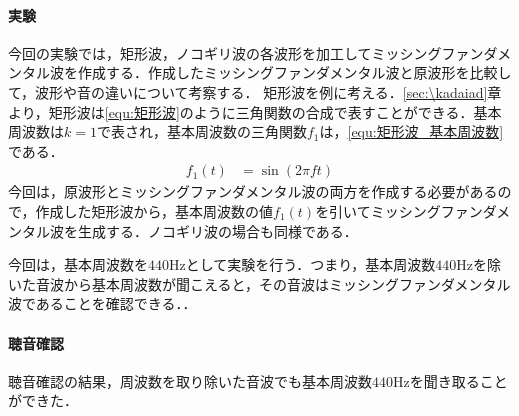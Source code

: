 \paragraph{実験}
今回の実験では，矩形波，ノコギリ波の各波形を加工してミッシングファンダメンタル波を作成する．作成したミッシングファンダメンタル波と原波形を比較して，波形や音の違いについて考察する．
\method
矩形波を例に考える．\ref{sec:\kadaiad}章より，矩形波は\eqref{equ:矩形波}のように三角関数の合成で表すことができる．基本周波数は\(k=1\)で表され，基本周波数の三角関数\(f_1\)は，\eqref{equ:矩形波_基本周波数}である．
\begin{align}
    f_1(t) & =\sin(2\pi ft)\label{equ:矩形波_基本周波数}
\end{align}
今回は，原波形とミッシングファンダメンタル波の両方を作成する必要があるので，作成した矩形波から，基本周波数の値\(f_1(t)\)を引いてミッシングファンダメンタル波を生成する．ノコギリ波の場合も同様である．\par
今回は，基本周波数を\(440\textrm{Hz}\)として実験を行う．つまり，基本周波数\(440\textrm{Hz}\)を除いた音波から基本周波数が聞こえると，その音波はミッシングファンダメンタル波であることを確認できる．\scall{}．
\result
\paragraph{聴音確認}聴音確認の結果，周波数を取り除いた音波でも基本周波数\(440\textrm{Hz}\)を聞き取ることができた．
